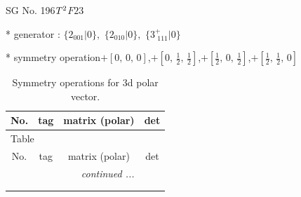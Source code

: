 \documentclass[fleqn,8pt]{jsarticle}
\begin{document}
\setcounter{MaxMatrixCols}{32}

\renewcommand{\tablename}{Table~}
\renewcommand{\figurename}{Figure~}
\begin{center}
\LARGE
SG No. 196\quad$T_{\rm }^{2}$\quad$F23$\quad[ cubic ]
\end{center}

* generator : $\{2{}_{001}|0\},\,\,\{2{}_{010}|0\},\,\,\{3^{+}_{\,\,111}|0\}$

* symmetry operation\quad$+\left[ 0,\, 0,\, 0 \right]$,\quad $+\left[ 0,\, \frac{1}{2},\, \frac{1}{2} \right]$,\quad $+\left[ \frac{1}{2},\, 0,\, \frac{1}{2} \right]$,\quad $+\left[ \frac{1}{2},\, \frac{1}{2},\, 0 \right]$
\renewcommand{\arraystretch}{1.3}
\begin{longtable}{cccc}
\caption{Symmetry operations for 3d polar vector.}
 \\
 \hline \hline
No. & tag & matrix (polar) & det \\ \hline \endfirsthead

\multicolumn{3}{l}{\tablename\ \thetable{}} \\
 \hline \hline
No. & tag & matrix (polar) & det \\ \hline \endhead

 \hline \hline
\multicolumn{3}{r}{\footnotesize\it continued ...} \\ \endfoot

 \hline \hline
\multicolumn{3}{r}{} \\ \endlastfoot


\end{longtable}
\end{document}
